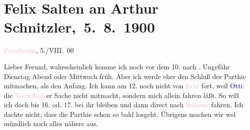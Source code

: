 

\renewcommand{\erwaehntePersonen}{Personen: Richard Beer-Hofmann, Paul Goldmann, Alfred Kerr, Ottilie Salten, Leo Van-Jung}
\renewcommand{\erwaehnteOrte}{Orte: Alpen, Bad Ischl, Karlsbad, Meran, Pressbaum, Schruns, Vorarlberg}
\renewcommand{\erwaehnteWerke}{}
\section[ Felix Salten an Arthur Schnitzler, 5. 8. 1900]{Felix Salten an Arthur Schnitzler, 5. 8. 1900}
\nopagebreak{}
\rehead{ }\normalsize\beginnumbering{}
\toendnotes[C]{\smallbreak\pagebreak[2]}
\toendnotes[C]{\smallbreak}
\pstart
           \raggedleft{}{\pb}\textcolor{pink}{Pressbaum}{}\ledrightnote{\textcolor{pink}{Pressbaum}}, 5./VIII. 00\pend
           
\pstart
           Lieber Freund, wahrscheinlich komme ich noch vor dem 10. nach \label{K_L03307-1v}\label{K_L03307-1h}. Ungefähr Dienstag{ }Abend oder Mittwoch{ }früh. Aber ich werde eher den Schluß der Parthie mitmachen, als den
               Anfang. Ich kann am 12. noch nicht von \textcolor{pink}{Ischl}{}\ledrightnote{\textcolor{pink}{Bad Ischl}} fort, weil \textcolor{blue}{Otti}{}\ledrightnote{\textcolor{blue}{Ottilie Salten}} die \textcolor{pink}{Vorarlberg}{}\ledrightnote{\textcolor{pink}{Vorarlberg}}er Sache nicht
               mitmacht, sondern mich allein fahren läßt. So will ich doch bis 16. od. 17. bei ihr
               bleiben und dann direct nach {\pb}\textcolor{pink}{Schruns}{}\ledrightnote{\textcolor{pink}{Schruns}} fahren. Ich dachte nicht, dass die
               Parthie schon so bald losgeht. Übrigens machen wir wol mündlich noch alles nähere
               aus.\pend
           
